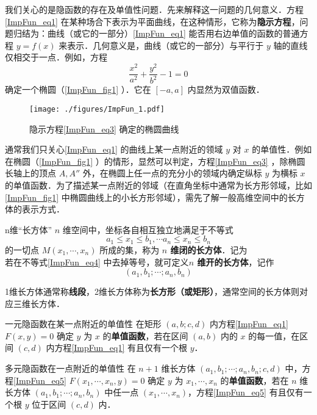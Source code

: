 我们关心的是隐函数的存在及单值性问题．先来解释这一问题的几何意义．方程\autoref{ImpFun_eq1} 在某种场合下表示为平面曲线，在这种情形，它称为\textbf{隐示方程}，问题归结为：曲线（或它的一部分）\autoref{ImpFun_eq1} 能否用右边单值的函数的普通方程 $y=f(x)$ 来表示．几何意义是，曲线（或它的一部分）与平行于 $y$ 轴的直线仅相交于一点．例如，方程 
\begin{equation}\label{ImpFun_eq3}
\frac{x^2}{a^2}+\frac{y^2}{b^2}-1=0
\end{equation}
确定一个椭圆（\autoref{ImpFun_fig1} ）．它在 $[-a,a]$ 内显然为双值函数．
\begin{figure}[ht]
\centering
\texttt{[image: ./figures/ImpFun\_1.pdf]}
\caption{隐示方程\autoref{ImpFun_eq3} 确定的椭圆曲线} \label{ImpFun_fig1}
\end{figure}
通常我们只关心\autoref{ImpFun_eq1} 的曲线上某一点附近的领域 $y$ 对 $x$ 的单值性．例如在椭圆（\autoref{ImpFun_fig1} ）的情形，显然可以判定，方程\autoref{ImpFun_eq3} ，除椭圆长轴上的顶点 $A,A''$ 外，在椭圆上任一点的充分小的领域内确定纵标 $y$ 为横标 $x$ 的单值函数．为了描述某一点附近的邻域（在直角坐标中通常为长方形邻域，比如\autoref{ImpFun_fig1} 中椭圆曲线上的小长方形邻域），需先了解一般高维空间中的长方体的表示方式．
\begin{definition}{n维“长方体”}
$n$ 维空间中，坐标各自相互独立地满足于不等式
\begin{equation}\label{ImpFun_eq4}
a_1\leq x_1\leq b_1,\cdots a_n\leq x_n\leq b_n
\end{equation}
的一切点 $M(x_1,\cdots,x_n)$ 所成的集，称为\textbf{ $n$ 维闭的长方体}．记为
\begin{equation}
[a_1,b_1;\cdots;a_n,b_n]
\end{equation}
若在不等式\autoref{ImpFun_eq4} 中去掉等号，就可定义\textbf{$n$ 维开的长方体}，记作
\begin{equation}
(a_1,b_1;\cdots;a_n,b_n)
\end{equation}

\end{definition}
1维长方体通常称\textbf{线段}，2维长方体称为\textbf{长方形（或矩形）}，通常空间的长方体则对应三维长方体．
\begin{definition}{一元隐函数在某一点附近的单值性}
在矩形 $(a,b;c,d)$ 内方程\autoref{ImpFun_eq1} $F(x,y)=0$ 确定 $y$ 为 $x$ 的\textbf{单值函数}，若在区间 $(a,b)$ 内的 $x$ 的每一值，在区间 $(c,d)$ 内方程\autoref{ImpFun_eq1} 有且仅有一个根 $y$．
\end{definition}

\begin{definition}{多元隐函数在一点附近的单值性}
在 $n+1$ 维长方体 $(a_1,b_1;\cdots;a_n,b_n;c,d)$ 中，方程\autoref{ImpFun_eq5} $F(x_1,\cdots,x_n,y)=0$ 确定 $y$ 为 $x_1,\cdots,x_n$ 的\textbf{单值函数}，若在 $n$ 维长方体 $(a_1,b_1;\cdots;a_n,b_n)$ 中任一点 $(x_1,\cdots,x_n)$，方程\autoref{ImpFun_eq5} 有且仅有一个根 $y$ 位于区间 $(c,d)$ 内．
\end{definition}

